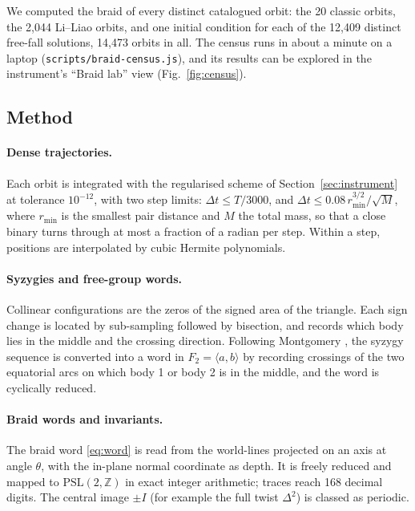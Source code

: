 \documentclass[11pt]{article}
\theoremstyle{remark}
\newcommand{\Z}{\mathbb{Z}}
\newcommand{\PSL}{\mathrm{PSL}}
\begin{document}
We computed the braid of every distinct catalogued orbit: the 20 classic orbits, the 2{,}044 Li--Liao orbits,
and one initial condition for each of the 12{,}409 distinct free-fall solutions, 14{,}473 orbits in all.
The census runs in about a minute on a laptop (\texttt{scripts/braid-census.js}), and its results can be
explored in the instrument's ``Braid lab'' view (Fig.~\ref{fig:census}).

\subsection{Method}

\paragraph{Dense trajectories.} Each orbit is integrated with the regularised scheme of
Section~\ref{sec:instrument} at tolerance $10^{-12}$, with two step limits: $\Delta t\le T/3000$, and
$\Delta t\le0.08\,r_{\min}^{3/2}/\sqrt{M}$, where $r_{\min}$ is the smallest pair distance and $M$ the total
mass, so that a close binary turns through at most a fraction of a radian per step. Within a step, positions are
interpolated by cubic Hermite polynomials.

\paragraph{Syzygies and free-group words.} Collinear configurations are the zeros of the signed area of the
triangle. Each sign change is located by sub-sampling followed by bisection, and records which body lies in the
middle and the crossing direction. Following Montgomery \cite{Montgomery1998}, the syzygy sequence is
converted into a word in $F_2=\langle a,b\rangle$ by recording crossings of the two equatorial arcs on which
body 1 or body 2 is in the middle, and the word is cyclically reduced.

\paragraph{Braid words and invariants.} The braid word \eqref{eq:word} is read from the world-lines projected
on an axis at angle $\theta$, with the in-plane normal coordinate as depth. It is freely reduced and mapped to
$\PSL(2,\Z)$ in exact integer arithmetic; traces reach 168 decimal digits. The central image $\pm I$ (for
example the full twist $\Delta^2$) is classed as periodic.
\end{document}
